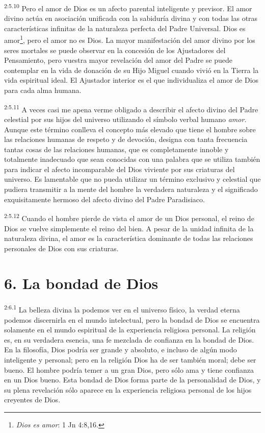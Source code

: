 \par
\textsuperscript{2:5.10} Pero el amor de Dios es un afecto parental inteligente y previsor. El amor divino actúa en asociación unificada con la sabiduría divina y con todas las otras características infinitas de la naturaleza perfecta del Padre Universal. Dios es amor\footnote{\textit{Dios es amor}: 1 Jn 4:8,16.}, pero el amor no es Dios. La mayor manifestación del amor divino por los seres mortales se puede observar en la concesión de los Ajustadores del Pensamiento, pero vuestra mayor revelación del amor del Padre se puede contemplar en la vida de donación de su Hijo Miguel cuando vivió en la Tierra la vida espiritual ideal. El Ajustador interior es el que individualiza el amor de Dios para cada alma humana.

\par
\textsuperscript{2:5.11} A veces casi me apena verme obligado a describir el afecto divino del Padre celestial por sus hijos del universo utilizando el símbolo verbal humano \textit{amor.} Aunque este término conlleva el concepto más elevado que tiene el hombre sobre las relaciones humanas de respeto y de devoción, designa con tanta frecuencia tantas cosas de las relaciones humanas, que es completamente innoble y totalmente inadecuado que sean conocidas con una palabra que se utiliza también para indicar el afecto incomparable del Dios viviente por sus criaturas del universo. Es lamentable que no pueda utilizar un término exclusivo y celestial que pudiera transmitir a la mente del hombre la verdadera naturaleza y el significado exquisitamente hermoso del afecto divino del Padre Paradisiaco.

\par
\textsuperscript{2:5.12} Cuando el hombre pierde de vista el amor de un Dios personal, el reino de Dios se vuelve simplemente el reino del bien. A pesar de la unidad infinita de la naturaleza divina, el amor es la característica dominante de todas las relaciones personales de Dios con sus criaturas.

\section*{6. La bondad de Dios}
\par
\textsuperscript{2:6.1} La belleza divina la podemos ver en el universo físico, la verdad eterna podemos discernirla en el mundo intelectual, pero la bondad de Dios se encuentra solamente en el mundo espiritual de la experiencia religiosa personal. La religión es, en su verdadera esencia, una fe mezclada de confianza en la bondad de Dios. En la filosofía, Dios podría ser grande y absoluto, e incluso de algún modo inteligente y personal; pero en la religión Dios ha de ser también moral; debe ser bueno. El hombre podría temer a un gran Dios, pero sólo ama y tiene confianza en un Dios bueno. Esta bondad de Dios forma parte de la personalidad de Dios, y su plena revelación sólo aparece en la experiencia religiosa personal de los hijos creyentes de Dios.

